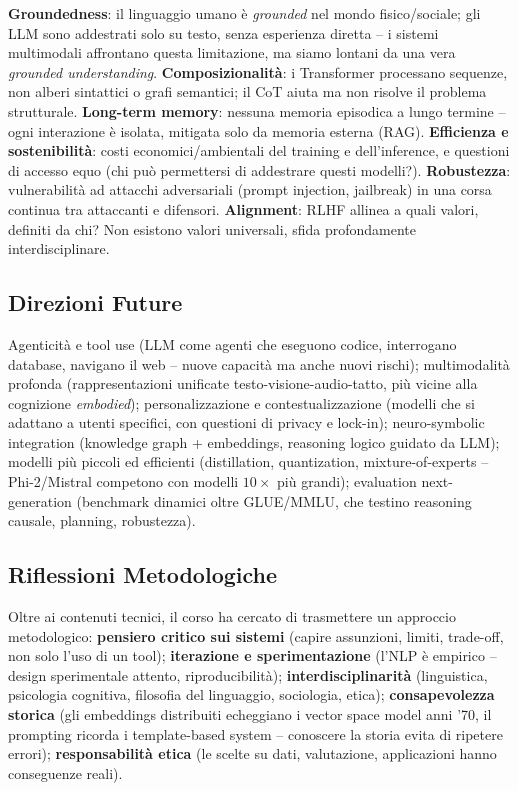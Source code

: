 \documentclass[12pt,a4paper]{article}
\begin{document}
\textbf{Groundedness}: il linguaggio umano \`e \emph{grounded} nel mondo fisico/sociale; gli LLM sono addestrati solo su testo, senza esperienza diretta -- i sistemi multimodali affrontano questa limitazione, ma siamo lontani da una vera \emph{grounded understanding}. \textbf{Composizionalit\`a}: i Transformer processano sequenze, non alberi sintattici o grafi semantici; il CoT aiuta ma non risolve il problema strutturale. \textbf{Long-term memory}: nessuna memoria episodica a lungo termine -- ogni interazione \`e isolata, mitigata solo da memoria esterna (RAG). \textbf{Efficienza e sostenibilit\`a}: costi economici/ambientali del training e dell'inference, e questioni di accesso equo (chi pu\`o permettersi di addestrare questi modelli?). \textbf{Robustezza}: vulnerabilit\`a ad attacchi adversariali (prompt injection, jailbreak) in una corsa continua tra attaccanti e difensori. \textbf{Alignment}: RLHF allinea a quali valori, definiti da chi? Non esistono valori universali, sfida profondamente interdisciplinare.

\subsection{Direzioni Future}

Agenticit\`a e tool use (LLM come agenti che eseguono codice, interrogano database, navigano il web -- nuove capacit\`a ma anche nuovi rischi); multimodalit\`a profonda (rappresentazioni unificate testo-visione-audio-tatto, pi\`u vicine alla cognizione \emph{embodied}); personalizzazione e contestualizzazione (modelli che si adattano a utenti specifici, con questioni di privacy e lock-in); neuro-symbolic integration (knowledge graph + embeddings, reasoning logico guidato da LLM); modelli pi\`u piccoli ed efficienti (distillation, quantization, mixture-of-experts -- Phi-2/Mistral competono con modelli $10\times$ pi\`u grandi); evaluation next-generation (benchmark dinamici oltre GLUE/MMLU, che testino reasoning causale, planning, robustezza).

\subsection{Riflessioni Metodologiche}

Oltre ai contenuti tecnici, il corso ha cercato di trasmettere un approccio metodologico: \textbf{pensiero critico sui sistemi} (capire assunzioni, limiti, trade-off, non solo l'uso di un tool); \textbf{iterazione e sperimentazione} (l'NLP \`e empirico -- design sperimentale attento, riproducibilit\`a); \textbf{interdisciplinarit\`a} (linguistica, psicologia cognitiva, filosofia del linguaggio, sociologia, etica); \textbf{consapevolezza storica} (gli embeddings distribuiti echeggiano i vector space model anni '70, il prompting ricorda i template-based system -- conoscere la storia evita di ripetere errori); \textbf{responsabilit\`a etica} (le scelte su dati, valutazione, applicazioni hanno conseguenze reali).
\end{document}
